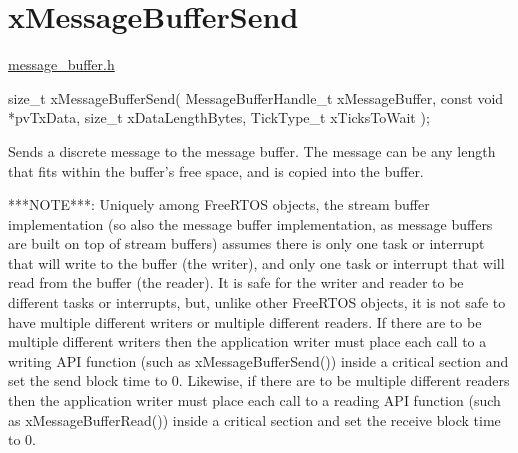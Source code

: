 \hypertarget{group__x_message_buffer_send}{}\section{x\+Message\+Buffer\+Send}
\label{group__x_message_buffer_send}
\mbox{\hyperlink{message__buffer_8h_source}{message\+\_\+buffer.\+h}}


\begin{DoxyPre}
size\_t xMessageBufferSend( MessageBufferHandle\_t xMessageBuffer,
                           const void *pvTxData,
                           size\_t xDataLengthBytes,
                           TickType\_t xTicksToWait );

\begin{DoxyPre}\end{DoxyPre}
\end{DoxyPre}



\begin{DoxyPre}
\begin{DoxyPre}   Sends a discrete message to the message buffer.  The message can be any
   length that fits within the buffer's free space, and is copied into the
   buffer.\end{DoxyPre}
\end{DoxyPre}



\begin{DoxyPre}
\begin{DoxyPre}   ***NOTE***:  Uniquely among FreeRTOS objects, the stream buffer
   implementation (so also the message buffer implementation, as message buffers
   are built on top of stream buffers) assumes there is only one task or
   interrupt that will write to the buffer (the writer), and only one task or
   interrupt that will read from the buffer (the reader).  It is safe for the
   writer and reader to be different tasks or interrupts, but, unlike other
   FreeRTOS objects, it is not safe to have multiple different writers or
   multiple different readers.  If there are to be multiple different writers
   then the application writer must place each call to a writing API function
   (such as xMessageBufferSend()) inside a critical section and set the send
   block time to 0.  Likewise, if there are to be multiple different readers
   then the application writer must place each call to a reading API function
   (such as xMessageBufferRead()) inside a critical section and set the receive
   block time to 0.\end{DoxyPre}
\end{DoxyPre}



